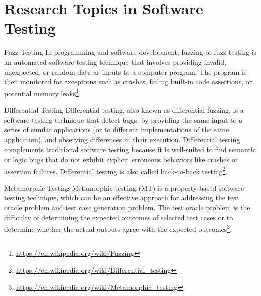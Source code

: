\documentclass{beamer}
\begin{document}
\section{Research Topics in Software Testing}
\begin{frame}[t]{Fuzz Testing}
In programming and software development, fuzzing or fuzz testing is an automated software testing technique that involves providing invalid, unexpected, or random data as inputs to a computer program. The program is then monitored for exceptions such as crashes, failing built-in code assertions, or potential memory leaks\footnote{\url{https://en.wikipedia.org/wiki/Fuzzing}}.
\end{frame}

\begin{frame}[t]{Differential Testing}
Differential testing, also known as differential fuzzing, is a software testing technique that detect bugs, by providing the same input to a series of similar applications (or to different implementations of the same application), and observing differences in their execution. Differential testing complements traditional software testing because it is well-suited to find semantic or logic bugs that do not exhibit explicit erroneous behaviors like crashes or assertion failures. Differential testing is also called back-to-back testing\footnote{\url{https://en.wikipedia.org/wiki/Differential_testing}}.
\end{frame}


\begin{frame}[t]{Metamorphic Testing}
Metamorphic testing (MT) is a property-based software testing technique, which can be an effective approach for addressing the test oracle problem and test case generation problem. The test oracle problem is the difficulty of determining the expected outcomes of selected test cases or to determine whether the actual outputs agree with the expected outcomes\footnote{\url{https://en.wikipedia.org/wiki/Metamorphic_testing}}.
\end{frame}
\end{document}
